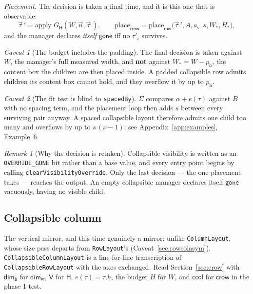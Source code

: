 \documentclass[11pt,a4paper]{article}
\newcommand{\Horz}{\mathsf{H}}
\newcommand{\Vrt}{\mathsf{V}}
\newcommand{\rrow}{\mathsf{row}}
\newcommand{\crow}{\mathsf{crow}}
\newcommand{\ccolp}{\mathsf{ccol}}
\newcommand{\gone}{\mathsf{gone}}
\newcommand{\Dimw}{\mathsf{dim}_{\mathrm{w}}}
\newcommand{\Dimh}{\mathsf{dim}_{\mathrm{h}}}
\newcommand{\jv}[1]{\texttt{#1}}       %
\theoremstyle{definition}
\theoremstyle{plain}
\theoremstyle{remark}
\newtheorem*{remark}{Remark}
\newtheorem{warning}{Caveat}[section]
\begin{document}
\emph{Placement.} The decision is taken a final time, and it is this one that is
observable:
\[
  \vec{\tau}\,' = \text{apply } G_\Horz(W, \vec{n}, \vec{\tau}\,),
  \qquad
  \mathrm{place}_{\crow} = \mathrm{place}_{\rrow}\bigl(\vec{\tau}\,', A, a_{\mathrm{v}}, s, W_{\!*}, H_{\!*}\bigr),
\]
and the manager declares \emph{itself} $\gone$ iff no $\tau'_i$ survives.

\begin{warning}[The budget includes the padding]
The final decision is taken against $W$, the manager's full measured width, and
\textbf{not} against $W_{\!*} = W - p_{\mathrm{h}}$, the content box the children
are then placed inside. A padded collapsible row admits children its content box
cannot hold, and they overflow it by up to $p_{\mathrm{h}}$.
\end{warning}

\begin{warning}[The fit test is blind to \texttt{spacedBy}]
\label{sec:collapsespaced}
$\Sigma$ compares $\alpha + e(\tau)$ against $B$ with no spacing term, and the
placement loop then adds $s$ between every surviving pair anyway. A spaced
collapsible layout therefore admits one child too many and overflows by up to
$s\,(\nu - 1)$; see Appendix~\ref{app:examples}, Example~6.
\end{warning}

\begin{remark}[Why the decision is retaken]
Collapsible visibility is written as an \jv{OVERRIDE\_GONE} bit rather than a
base value, and every entry point begins by calling
\jv{clearVisibilityOverride}. Only the last decision --- the one placement takes
--- reaches the output. An empty collapsible manager declares itself $\gone$
vacuously, having no visible child.
\end{remark}

\subsection{Collapsible column}
\label{sec:ccol}

The vertical mirror, and this time genuinely a mirror: unlike \jv{ColumnLayout},
whose size pass departs from \jv{RowLayout}'s (Caveat~\ref{sec:rowcolasym}),
\jv{CollapsibleColumnLayout} is a line-for-line transcription of
\jv{CollapsibleRowLayout} with the axes exchanged. Read
Section~\ref{sec:crow} with $\Dimh$ for $\Dimw$, $\Vrt$ for $\Horz$, $e(\tau) =
\tau.h$, the budget $H$ for $W$, and $\ccolp$ for $\crow$ in the phase-1 test.
\end{document}
